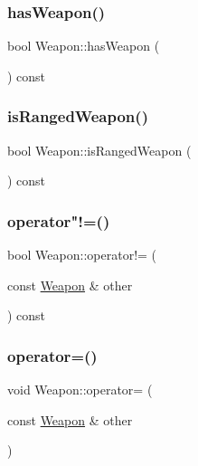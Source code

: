 \subsubsection{\texorpdfstring{has\+Weapon()}{hasWeapon()}}
{\footnotesize\ttfamily bool Weapon\+::has\+Weapon (\begin{DoxyParamCaption}{ }\end{DoxyParamCaption}) const}

\mbox{\label{class_weapon_a05aac2a3ad6a6b173025eb66c20de924}} 
\subsubsection{\texorpdfstring{is\+Ranged\+Weapon()}{isRangedWeapon()}}
{\footnotesize\ttfamily bool Weapon\+::is\+Ranged\+Weapon (\begin{DoxyParamCaption}{ }\end{DoxyParamCaption}) const}

\mbox{\label{class_weapon_a3e7097112f2e3e2eff39469af5d610d6}} 
\subsubsection{\texorpdfstring{operator"!=()}{operator!=()}}
{\footnotesize\ttfamily bool Weapon\+::operator!= (\begin{DoxyParamCaption}\item[{const \mbox{\hyperlink{class_weapon}{Weapon}} \&}]{other }\end{DoxyParamCaption}) const}

\mbox{\label{class_weapon_a9a4297ad2057a660e2a7bd2c690f1ada}} 
\subsubsection{\texorpdfstring{operator=()}{operator=()}}
{\footnotesize\ttfamily void Weapon\+::operator= (\begin{DoxyParamCaption}\item[{const \mbox{\hyperlink{class_weapon}{Weapon}} \&}]{other }\end{DoxyParamCaption})}

